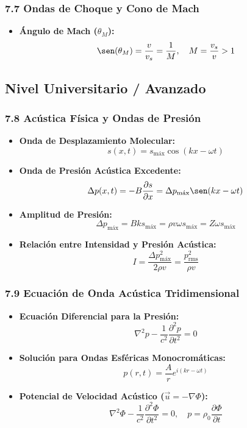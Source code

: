 \documentclass[11pt,a4paper]{article}
\begin{document}
\subsubsection*{7.7 Ondas de Choque y Cono de Mach}

\begin{itemize}
  \item \textbf{Ángulo de Mach ($\theta_M$):}
  \[
    \sen(\theta_M) = \frac{v}{v_s} = \frac{1}{M}, \quad M = \frac{v_s}{v} > 1
  \]
\end{itemize}

\subsection*{Nivel Universitario / Avanzado}

\subsubsection*{7.8 Acústica Física y Ondas de Presión}

\begin{itemize}
  \item \textbf{Onda de Desplazamiento Molecular:}
  \[
    s(x, t) = s_{\text{máx}} \cos(kx - \omega t)
  \]
  \item \textbf{Onda de Presión Acústica Excedente:}
  \[
    \Delta p(x, t) = -B \frac{\partial s}{\partial x} = \Delta p_{\text{máx}} \sen(kx - \omega t)
  \]
  \item \textbf{Amplitud de Presión:}
  \[
    \Delta p_{\text{máx}} = B k s_{\text{máx}} = \rho v \omega s_{\text{máx}} = Z \omega s_{\text{máx}}
  \]
  \item \textbf{Relación entre Intensidad y Presión Acústica:}
  \[
    I = \frac{\Delta p_{\text{máx}}^2}{2\rho v} = \frac{p_{\text{rms}}^2}{\rho v}
  \]
\end{itemize}

\subsubsection*{7.9 Ecuación de Onda Acústica Tridimensional}

\begin{itemize}
  \item \textbf{Ecuación Diferencial para la Presión:}
  \[
    \nabla^2 p - \frac{1}{c^2} \frac{\partial^2 p}{\partial t^2} = 0
  \]
  \item \textbf{Solución para Ondas Esféricas Monocromáticas:}
  \[
    p(r, t) = \frac{A}{r} e^{i(kr - \omega t)}
  \]
  \item \textbf{Potencial de Velocidad Acústico ($\vec{u} = -\nabla \Phi$):}
  \[
    \nabla^2 \Phi - \frac{1}{c^2} \frac{\partial^2 \Phi}{\partial t^2} = 0, \quad p = \rho_0 \frac{\partial \Phi}{\partial t}
  \]
\end{itemize}
\end{document}
